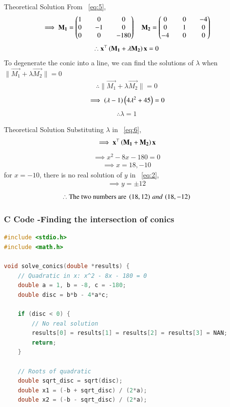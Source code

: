\documentclass{beamer}
\begin{document}
\begin{frame}{Theoretical Solution}
From ~\eqref{eq:5},
\begin{align}
    \implies \mathbf{M_1}=\begin{pmatrix}1&&0&&0\\0&&-1&&0\\0&&0&&-180\end{pmatrix} \quad 
    \mathbf{M_2}=\begin{pmatrix}0&&0&&-4\\0&&1&&0\\-4&&0&&0\end{pmatrix}
\end{align}
\begin{align}
    \therefore \mathbf{x}^{\top}\left(\mathbf{M_1+\lambda M_2}\right)\mathbf{x}=0
\end{align}
To degenerate the conic into a line, we can find the solutions of $\lambda$ when $\|\vec{M_1}+\lambda\vec{M_2}\|=0$ 
\begin{align}
    \therefore \|\vec{M_1}+\lambda\vec{M_2}\|=0 \label{eq:6}
\end{align}
\begin{align}
    \implies \left(\lambda-1\right)\left(4\lambda^2+45\right)=0
\end{align}
\begin{align}
    \therefore \lambda=1
\end{align}
\end{frame}

\begin{frame}{Theoretical Solution}
Substituting $\lambda$ in ~\eqref{eq:6},
\begin{align}
    \implies \mathbf{x}^{\top}\left(\mathbf{M_1}+\mathbf{M_2}\right)\mathbf{x}
\end{align}
\begin{align}
    \implies x^2-8x-180=0
\end{align}
\begin{align}
    \implies x=18,-10
\end{align}
for $x=-10$, there is no real solution of $y$ in ~\eqref{eq:2},
\begin{align}
    \implies y=\pm 12
\end{align}
\begin{align}
    \therefore \text{The two numbers are }\left(18,12\right)\, and\, \left(18,-12\right)
\end{align}

\end{frame}

\begin{frame}[fragile]
    \frametitle{C Code -Finding the intersection of conics}

    \begin{lstlisting}[language=C]
#include <stdio.h>
#include <math.h>

void solve_conics(double *results) {
    // Quadratic in x: x^2 - 8x - 180 = 0
    double a = 1, b = -8, c = -180;
    double disc = b*b - 4*a*c;

    if (disc < 0) {
        // No real solution
        results[0] = results[1] = results[2] = results[3] = NAN;
        return;
    }

    // Roots of quadratic
    double sqrt_disc = sqrt(disc);
    double x1 = (-b + sqrt_disc) / (2*a);
    double x2 = (-b - sqrt_disc) / (2*a);


    \end{lstlisting}
\end{frame}
\end{document}
